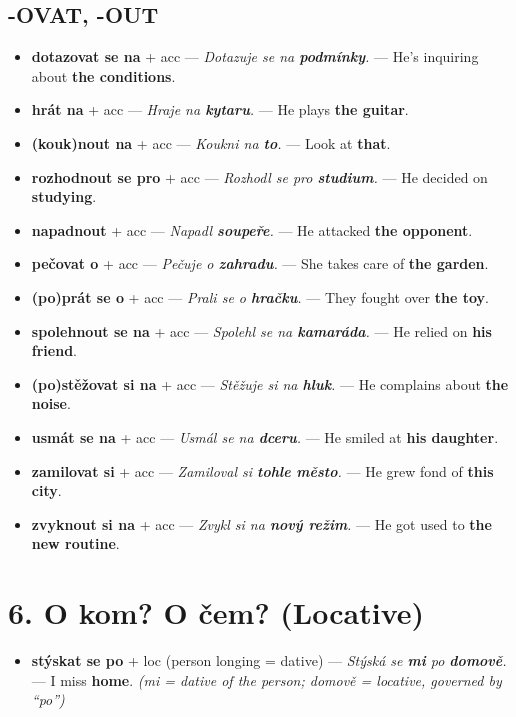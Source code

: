 \documentclass[12pt]{book}
\begin{document}
\subsection*{-OVAT, -OUT}
\begin{itemize}
    \item \textbf{dotazovat se na} + acc --- \textit{Dotazuje se na \textbf{podmínky}.} --- He's inquiring about \textbf{the conditions}.
    \item \textbf{hrát na} + acc --- \textit{Hraje na \textbf{kytaru}.} --- He plays \textbf{the guitar}.
    \item \textbf{(kouk)nout na} + acc --- \textit{Koukni na \textbf{to}.} --- Look at \textbf{that}.
    \item \textbf{rozhodnout se pro} + acc --- \textit{Rozhodl se pro \textbf{studium}.} --- He decided on \textbf{studying}.
    \item \textbf{napadnout} + acc --- \textit{Napadl \textbf{soupeře}.} --- He attacked \textbf{the opponent}.
    \item \textbf{pečovat o} + acc --- \textit{Pečuje o \textbf{zahradu}.} --- She takes care of \textbf{the garden}.
    \item \textbf{(po)prát se o} + acc --- \textit{Prali se o \textbf{hračku}.} --- They fought over \textbf{the toy}.
    \item \textbf{spolehnout se na} + acc --- \textit{Spolehl se na \textbf{kamaráda}.} --- He relied on \textbf{his friend}.
    \item \textbf{(po)stěžovat si na} + acc --- \textit{Stěžuje si na \textbf{hluk}.} --- He complains about \textbf{the noise}.
    \item \textbf{usmát se na} + acc --- \textit{Usmál se na \textbf{dceru}.} --- He smiled at \textbf{his daughter}.
    \item \textbf{zamilovat si} + acc --- \textit{Zamiloval si \textbf{tohle město}.} --- He grew fond of \textbf{this city}.
    \item \textbf{zvyknout si na} + acc --- \textit{Zvykl si na \textbf{nový režim}.} --- He got used to \textbf{the new routine}.
\end{itemize}

\section{6. O kom? O čem? (Locative)}
\begin{itemize}
    \item \textbf{stýskat se po} + loc (person longing = dative) --- \textit{Stýská se \textbf{mi} po \textbf{domově}.} --- 
        I miss \textbf{home}. \textit{(mi = dative of the person; domově = locative, governed by ``po'')}
\end{itemize}
\end{document}
